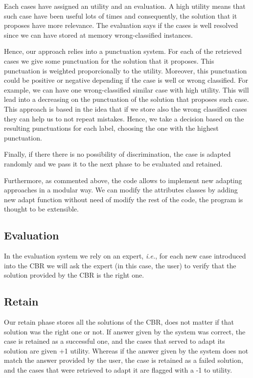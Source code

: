 \documentclass[11pt]{article}
\begin{document}
Each cases have assigned an utility and an evaluation. A high utility means that such case have been useful lots of times and consequently, the solution that it proposes have more relevance. The evaluation says if the cases is well resolved since we can have stored at memory wrong-classified instances.

Hence, our approach relies into a punctuation system. For each of the retrieved cases we give some punctuation for the solution that it proposes. This punctuation is weighted proporcionally to the utility. Moreover, this punctuation could be positive or negative depending if the case is well or wrong classified. For example, we can have one wrong-classified similar case with high utility. This will lead into a decreasing on the punctuation of the solution that proposes such case. This approach is based in the idea that if we store also the wrong classified cases they can help us to not repeat mistakes. Hence, we take a decision based on the resulting punctuations for each label, choosing the one with the highest punctuation. 

Finally, if there there is no possibility of discrimination, the case is adapted randomly and we pass it to the next phase to be evaluated and retained.

Furthermore, as commented above, the code allows to implement new adapting approaches in a modular way. We can modify the attributes classes by adding new adapt function without need of modify the rest of the code, the program is thought to be extensible.

\subsection{Evaluation}

In the evaluation system we rely on an expert, \emph{i.e.}, for each new case introduced into the CBR we will ask the expert (in this case, the user) to verify that the solution provided by the CBR is the right one.

\subsection{Retain}

Our retain phase stores all the solutions of the CBR, does not matter if that solution was the right one or not. If answer given by the system was correct, the case is retained as a successful one, and the cases that served to adapt its solution are given +1 utility. Whereas if the answer given by the system does not match the answer provided by the user, the case is retained as a failed solution, and the cases that were retrieved to adapt it are flagged with a -1 to utility.
\end{document}
